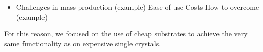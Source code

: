 

\begin{itemize}	
	\item Challenges in mass production (example)
  	  \subitem Ease of use
 	  \subitem Costs
	    \subsubitem How to overcome (example)
\end{itemize}	

For this reason, we focused on the use of cheap substrates to achieve the very same functionality as on expensive single crystals.
